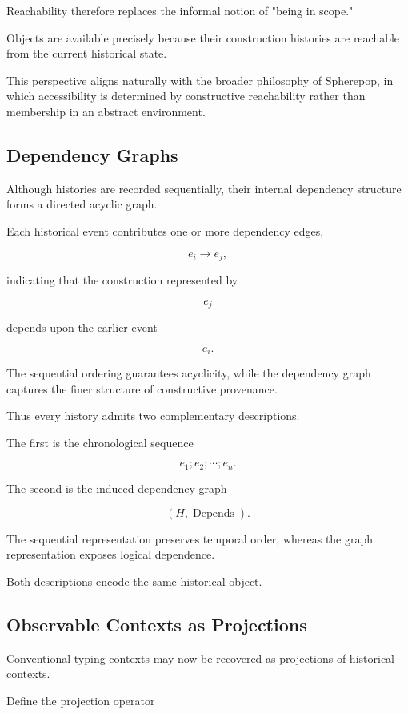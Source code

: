 \documentclass[12pt,oneside]{article}
\theoremstyle{definition}
\theoremstyle{remark}
\DeclareMathOperator{\Depends}{Depends}
\begin{document}
Reachability therefore replaces the informal notion of "being in scope."

Objects are available precisely because their construction histories are
reachable from the current historical state.

This perspective aligns naturally with the broader philosophy of Spherepop, in
which accessibility is determined by constructive reachability rather than
membership in an abstract environment.

\subsection{Dependency Graphs}

Although histories are recorded sequentially, their internal dependency
structure forms a directed acyclic graph.

Each historical event contributes one or more dependency edges,

\[
e_i
\longrightarrow
e_j,
\]

indicating that the construction represented by

\[
e_j
\]

depends upon the earlier event

\[
e_i.
\]

The sequential ordering guarantees acyclicity, while the dependency graph
captures the finer structure of constructive provenance.

Thus every history admits two complementary descriptions.

The first is the chronological sequence

\[
e_1;
e_2;
\cdots;
e_n.
\]

The second is the induced dependency graph

\[
(H,\Depends).
\]

The sequential representation preserves temporal order, whereas the graph
representation exposes logical dependence.

Both descriptions encode the same historical object.

\subsection{Observable Contexts as Projections}

Conventional typing contexts may now be recovered as projections of historical
contexts.

Define the projection operator
\end{document}
